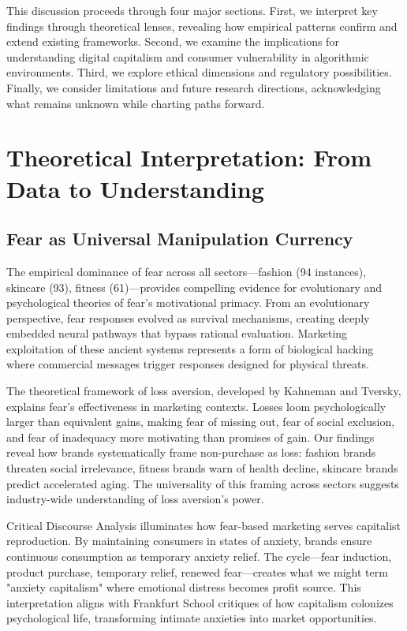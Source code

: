 This discussion proceeds through four major sections. First, we interpret key findings through theoretical lenses, revealing how empirical patterns confirm and extend existing frameworks. Second, we examine the implications for understanding digital capitalism and consumer vulnerability in algorithmic environments. Third, we explore ethical dimensions and regulatory possibilities. Finally, we consider limitations and future research directions, acknowledging what remains unknown while charting paths forward.

\section{Theoretical Interpretation: From Data to Understanding}
\label{sec:theoretical_interpretation}

\subsection{Fear as Universal Manipulation Currency}

The empirical dominance of fear across all sectors—fashion (94 instances), skincare (93), fitness (61)—provides compelling evidence for evolutionary and psychological theories of fear's motivational primacy. From an evolutionary perspective, fear responses evolved as survival mechanisms, creating deeply embedded neural pathways that bypass rational evaluation. Marketing exploitation of these ancient systems represents a form of biological hacking where commercial messages trigger responses designed for physical threats.

The theoretical framework of loss aversion, developed by Kahneman and Tversky, explains fear's effectiveness in marketing contexts. Losses loom psychologically larger than equivalent gains, making fear of missing out, fear of social exclusion, and fear of inadequacy more motivating than promises of gain. Our findings reveal how brands systematically frame non-purchase as loss: fashion brands threaten social irrelevance, fitness brands warn of health decline, skincare brands predict accelerated aging. The universality of this framing across sectors suggests industry-wide understanding of loss aversion's power.

Critical Discourse Analysis illuminates how fear-based marketing serves capitalist reproduction. By maintaining consumers in states of anxiety, brands ensure continuous consumption as temporary anxiety relief. The cycle—fear induction, product purchase, temporary relief, renewed fear—creates what we might term "anxiety capitalism" where emotional distress becomes profit source. This interpretation aligns with Frankfurt School critiques of how capitalism colonizes psychological life, transforming intimate anxieties into market opportunities.

